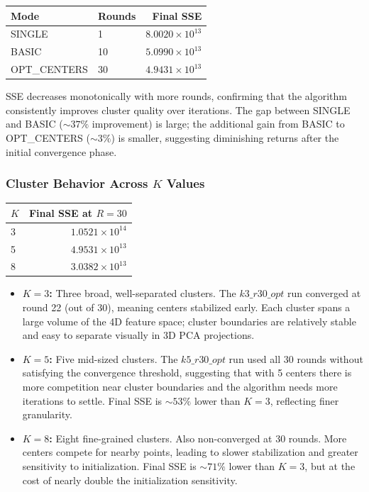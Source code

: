 \documentclass[11pt]{article}
\begin{document}
\begin{center}
\begin{tabular}{@{}llr@{}}
  \rowcolor{tableheader}
  \color{white}\textbf{Mode} &
  \color{white}\textbf{Rounds} &
  \color{white}\textbf{Final SSE} \\
  \midrule
  SINGLE       & 1  & $8.0020\times10^{13}$ \\
  \rowcolor{tablealt}
  BASIC        & 10 & $5.0990\times10^{13}$ \\
  OPT\_CENTERS & 30 & $4.9431\times10^{13}$ \\
\end{tabular}
\end{center}

SSE decreases monotonically with more rounds, confirming that the algorithm consistently improves cluster quality over iterations. The gap between SINGLE and BASIC (${\sim}37\%$ improvement) is large; the additional gain from BASIC to OPT\_CENTERS (${\sim}3\%$) is smaller, suggesting diminishing returns after the initial convergence phase.

\subsubsection*{Cluster Behavior Across $K$ Values}

\begin{center}
\begin{tabular}{@{}lr@{}}
  \rowcolor{tableheader}
  \color{white}\textbf{$K$} &
  \color{white}\textbf{Final SSE at $R=30$} \\
  \midrule
  3 & $1.0521\times10^{14}$ \\
  \rowcolor{tablealt}
  5 & $4.9531\times10^{13}$ \\
  8 & $3.0382\times10^{13}$ \\
\end{tabular}
\end{center}

\begin{itemize}[noitemsep,topsep=2pt]
  \item \textbf{$K=3$:} Three broad, well-separated clusters. The $k3\_r30\_opt$ run converged at round 22 (out of 30), meaning centers stabilized early. Each cluster spans a large volume of the 4D feature space; cluster boundaries are relatively stable and easy to separate visually in 3D PCA projections.
  \item \textbf{$K=5$:} Five mid-sized clusters. The $k5\_r30\_opt$ run used all 30 rounds without satisfying the convergence threshold, suggesting that with 5 centers there is more competition near cluster boundaries and the algorithm needs more iterations to settle. Final SSE is ${\sim}53\%$ lower than $K{=}3$, reflecting finer granularity.
  \item \textbf{$K=8$:} Eight fine-grained clusters. Also non-converged at 30 rounds. More centers compete for nearby points, leading to slower stabilization and greater sensitivity to initialization. Final SSE is ${\sim}71\%$ lower than $K{=}3$, but at the cost of nearly double the initialization sensitivity.
\end{itemize}
\end{document}
